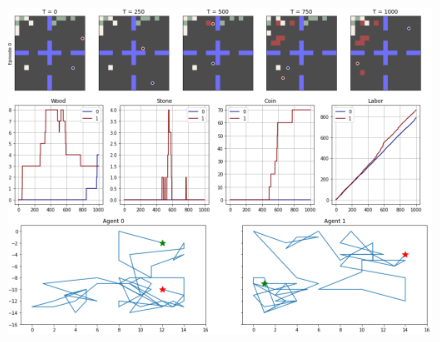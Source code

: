 \documentclass[final]{beamer}
\newlength{\twocolwid}
\begin{document}
\begin{frame}[t]
\begin{columns}[t]
\begin{column}{\twocolwid}
\begin{figure}
\includegraphics[height = 32.5cm]{figs/quadrant-notrading.png}

\end{figure}
\end{column}
\end{columns}
\end{frame}
\end{document}

